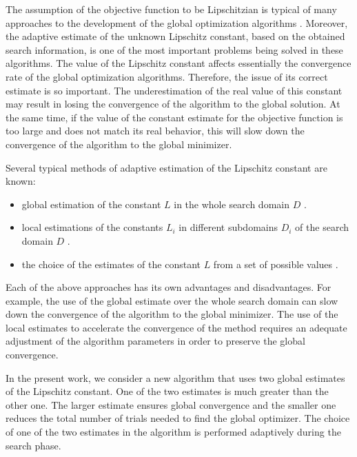 \documentclass[runningheads]{llncs}
\begin{document}
The assumption of the objective function to be Lipschitzian is typical of many approaches to the development of the global optimization algorithms \cite{Evtushenko2013,Zilinskas2010,Pinter1996,Strongin2000}. Moreover, the adaptive estimate of the unknown Lipschitz constant, based on the obtained search information, is one of the most important problems being solved in these algorithms. 
The value of the Lipschitz constant affects essentially the convergence rate of the global optimization algorithms. Therefore, the issue of its correct estimate is so important. 
The underestimation of the real value of this constant may result in losing the convergence of the algorithm to the global solution. At the same time, if the value of the constant estimate for the objective function is too large and does not match its real behavior, this will slow down the convergence of the algorithm to the global minimizer. 

Several typical methods of adaptive estimation of the Lipschitz constant are known:
\begin{itemize}
	\item global estimation of the constant $L$ in the whole search domain $D$ \cite{Horst1996,Pinter1996,Strongin2000}.
	\item local estimations of the constants $L_i$ in different subdomains $D_i$ of the search domain $D$ \cite{Kvasov2003,Sergeyev2010,Sergeyev2016}.
	\item the choice of the estimates of the constant $L$ from a set of possible values \cite{Gablonsky2001,Jones1993,Jones2009,Sergeyev2006}.
\end{itemize}

Each of the above approaches has its own advantages and disadvantages. For example, the use of the global estimate over the whole search domain can slow down the convergence of the algorithm to the global minimizer. The use of the local estimates to accelerate the convergence of the method requires an adequate adjustment of the algorithm parameters in order to preserve the global convergence. 

In the present work, we  consider a new algorithm that uses two global estimates of the Lipschitz constant. One of the two estimates is much greater than the other one. 
The larger estimate ensures global convergence and the smaller one reduces the total number of trials needed to find the global optimizer.
The choice of one of the two estimates in the algorithm is performed adaptively during the search phase.
\end{document}
